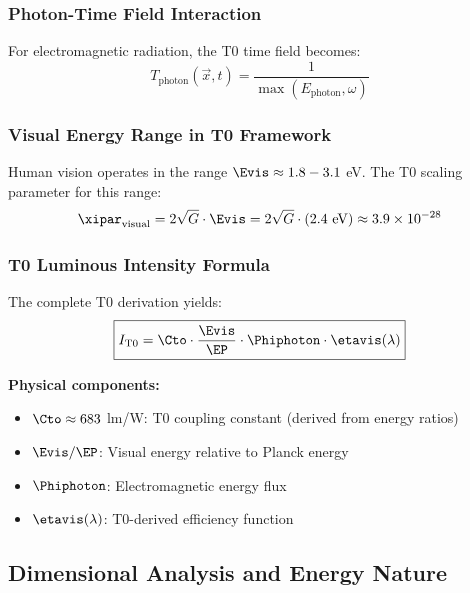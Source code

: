 	\subsubsection{Photon-Time Field Interaction}
	\label{subsubsec:photon_time_field}
	
	For electromagnetic radiation, the T0 time field becomes:
	\begin{equation}
		T_{\text{photon}}(\vec{x},t) = \frac{1}{\max(E_{\text{photon}}, \omega)}
		\label{eq:photon_time_field}
	\end{equation}
	
	\subsubsection{Visual Energy Range in T0 Framework}
	\label{subsubsec:visual_energy_range}
	
	Human vision operates in the range $\Evis \approx 1.8 - 3.1$ eV. The T0 scaling parameter for this range:
	\begin{equation}
		\xipar_{\text{visual}} = 2\sqrt{G} \cdot \Evis = 2\sqrt{G} \cdot (2.4 \text{ eV}) \approx 3.9 \times 10^{-28}
		\label{eq:xi_visual}
	\end{equation}
	
	\subsubsection{T0 Luminous Intensity Formula}
	\label{subsubsec:t0_luminous_formula}
	
	The complete T0 derivation yields:
	\begin{equation}
		\boxed{I_{\text{T0}} = \Cto \cdot \frac{\Evis}{\EP} \cdot \Phiphoton \cdot \etavis(\lambda)}
		\label{eq:t0_candela_fundamental}
	\end{equation}
	
	\textbf{Physical components:}
	\begin{itemize}
		\item $\Cto \approx 683$ lm/W: T0 coupling constant (derived from energy ratios)
		\item $\Evis/\EP$: Visual energy relative to Planck energy
		\item $\Phiphoton$: Electromagnetic energy flux
		\item $\etavis(\lambda)$: T0-derived efficiency function
	\end{itemize}
	
	\subsection{Dimensional Analysis and Energy Nature}
	\label{subsec:candela_dimensional}
	
